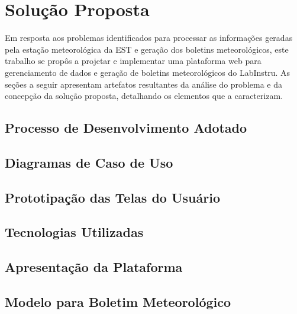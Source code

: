 \chapter{Solução Proposta} \label{cap:solucao}

Em resposta aos problemas identificados para processar as informações geradas pela estação meteorológica da EST e geração dos boletins meteorológicos, este trabalho se propôs a projetar e implementar uma plataforma web para gerenciamento de dados e geração de boletins meteorológicos do LabInstru. As seções a seguir apresentam artefatos resultantes da análise do problema e da concepção da solução proposta, detalhando os elementos que a caracterizam.


\section{Processo de Desenvolvimento Adotado}


\section{Diagramas de Caso de Uso}


\section{Prototipação das Telas do Usuário}


\section{Tecnologias Utilizadas}


\section{Apresentação da Plataforma}


\section{Modelo para Boletim Meteorológico}

